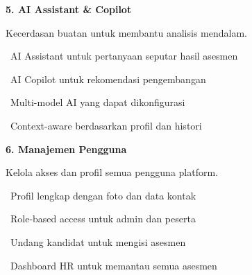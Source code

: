 \documentclass[a4paper]{article}
\begin{document}
\vspace{8pt}

\noindent
\begin{minipage}[t]{0.485\textwidth}
    \colorbox{OrangePrimary}{%
        \begin{minipage}{\dimexpr\textwidth-2\fboxsep\relax}
            {\fontsize{10}{13}\selectfont\bfseries\color{White} 5. AI Assistant \& Copilot}
        \end{minipage}}\par
    \vspace{4pt}
    {\fontsize{9}{12}\selectfont\color{TextDark}%
    Kecerdasan buatan untuk membantu analisis mendalam.\par\vspace{3pt}
    \textbullet\ AI Assistant untuk pertanyaan seputar hasil asesmen\par\vspace{2pt}%
    \textbullet\ AI Copilot untuk rekomendasi pengembangan\par\vspace{2pt}%
    \textbullet\ Multi-model AI yang dapat dikonfigurasi\par\vspace{2pt}%
    \textbullet\ Context-aware berdasarkan profil dan histori}%
\end{minipage}%
\hfill
\begin{minipage}[t]{0.485\textwidth}
    \colorbox{FuchsiaDark}{%
        \begin{minipage}{\dimexpr\textwidth-2\fboxsep\relax}
            {\fontsize{10}{13}\selectfont\bfseries\color{White} 6. Manajemen Pengguna}
        \end{minipage}}\par
    \vspace{4pt}
    {\fontsize{9}{12}\selectfont\color{TextDark}%
    Kelola akses dan profil semua pengguna platform.\par\vspace{3pt}
    \textbullet\ Profil lengkap dengan foto dan data kontak\par\vspace{2pt}%
    \textbullet\ Role-based access untuk admin dan peserta\par\vspace{2pt}%
    \textbullet\ Undang kandidat untuk mengisi asesmen\par\vspace{2pt}%
    \textbullet\ Dashboard HR untuk memantau semua asesmen}%
\end{minipage}
\end{document}
